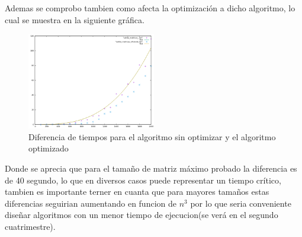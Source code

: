 Ademas se comprobo tambien como afecta la optimización a dicho algoritmo, lo cual se muestra en la siguiente gráfica.

\begin{figure}[H]
  \centering
  \includegraphics[width=0.5\textwidth]{./Imagenes/mult_matrices_optimizada_vs.png}
  \caption{Diferencia de tiempos para el algoritmo sin optimizar y el algoritmo optimizado}
\end{figure}

Donde se aprecia que para el tamaño de matriz máximo probado la diferencia es de 40 segundo, lo que en diversos casos puede representar un tiempo crítico, tambien es importante terner en cuanta que para mayores tamaños estas diferencias seguirian aumentando en funcion de $n^{3}$ por lo que seria conveniente diseñar algoritmos con un menor tiempo de ejecucion(se verá en el segundo cuatrimestre).
